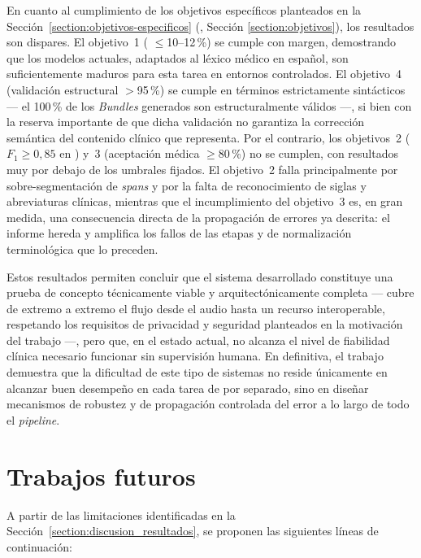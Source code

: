 En cuanto al cumplimiento de los objetivos específicos planteados en la
Sección~\ref{section:objetivos-especificos} (, Sección
\ref{section:objetivos}), los resultados son dispares. El objetivo~1 (
$\le$10--12\,\%) se cumple con margen, demostrando que los modelos  actuales,
adaptados al léxico médico en español, son suficientemente maduros para esta tarea en entornos
controlados. El objetivo~4 (validación estructural  $>$95\,\%) se cumple en
términos estrictamente sintácticos --- el 100\,\% de los \textit{Bundles} generados son
estructuralmente válidos ---, si bien con la reserva importante de que dicha validación no garantiza
la corrección semántica del contenido clínico que representa. Por el contrario, los objetivos~2
($F_1 \ge 0,85$ en ) y~3 (aceptación médica $\ge$80\,\%) no se cumplen, con
resultados muy por debajo de los umbrales fijados. El objetivo~2 falla principalmente por
sobre-segmentación de \textit{spans} y por la falta de reconocimiento de siglas y abreviaturas
clínicas, mientras que el incumplimiento del objetivo~3 es, en gran medida, una consecuencia directa
de la propagación de errores ya descrita: el informe  hereda y amplifica los fallos
de las etapas  y de normalización terminológica que lo preceden.

Estos resultados permiten concluir que el sistema desarrollado constituye una prueba de concepto
técnicamente viable y arquitectónicamente completa --- cubre de extremo a extremo el flujo desde el
audio hasta un recurso  interoperable, respetando los requisitos de privacidad y
seguridad planteados en la motivación del trabajo ---, pero que, en el estado actual, no alcanza el
nivel de fiabilidad clínica necesario funcionar sin supervisión humana. En definitiva, el trabajo demuestra
que la dificultad de este tipo de sistemas no reside
únicamente en alcanzar buen desempeño en cada tarea de  por separado, sino en
diseñar mecanismos de robustez y de propagación controlada del error a lo largo de todo el
\textit{pipeline}.

\section{Trabajos futuros}\label{section:trabajos_futuros}

A partir de las limitaciones identificadas en la Sección~\ref{section:discusion_resultados}, se
proponen las siguientes líneas de continuación:

